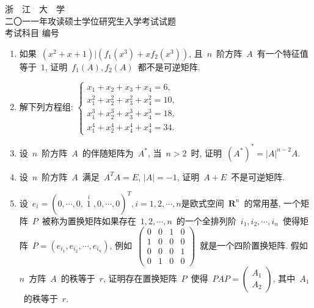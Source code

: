 \documentclass[UTF8,a4paper,11pt]{article}
\begin{document}
\newpage
\setcounter{page}{1}

\begin{center}
	{\Huge 浙~~江~~大~~学}\\
	\setlength{\parskip}{5pt}
	{\Large 二〇一一年攻读硕士学位研究生入学考试试题}\\
	\setlength{\parskip}{10 pt}
	{\Large 考试科目\underline{} 编号\underline{}}
\end{center}

\begin{enumerate}
	\item 如果~$(x^2+x+1)|(f_1(x^3)+xf_2(x^3))$, 且~$n$~阶方阵~$A$~有一个特征值等于~$1$, 证明~$f_1(A),f_2(A)$~都不是可逆矩阵.
	      \vspace{2em}
	\item 解下列方程组: $\begin{cases} x_1+x_2+x_3+x_4=6,\\x_1^2+x_2^2+x_3^2+x_4^2=10,\\ x_1^3+x_2^3+x_3^3+x_4^3=18,\\ x_1^4+x_2^4+x_4^4+x_4^4=34.\end{cases}$
	      \vspace{2em}
	\item 设~$n$~阶方阵~$A$~的伴随矩阵为~$A^{*}$, 当~$n>2$~时, 证明~$(A^{*})^{*}=|A|^{n-2}A$.
	      \vspace{2em}
	\item 设~$n$~阶方阵~$A$~满足~$A^{T}A=E$, $|A|=-1$, 证明~$A+E$~不是可逆矩阵.
	      \vspace{2em}
	\item 设~$e_i=(0,\cdots,0,\mathop{1}\limits^{i},0,\cdots,0)^{T}, i=1,2,\cdots,n$是欧式空间~$\mathbf{R}^n$~的常用基, 一个矩阵~$P$~被称为置换矩阵如果存在~$1,2,\cdots,n$~的一个全排列阶~$i_1,i_2,\cdots,i_n$~使得矩阵~$P=(e_{i_1},e_{i_2}, \cdots, e_{i_n})$, 例如~$\begin{pmatrix}0 & 0 & 1 & 0\\ 1 & 0 & 0 & 0\\ 0 & 0 & 0 & 1\\ 0 & 1 & 0 & 0 \end{pmatrix}$~就是一个四阶置换矩阵. 假如~$n$~方阵~$A$~的秩等于~$r$, 证明存在置换矩阵~$P$~使得~$PAP=\begin{pmatrix}A_1\\A_2\end{pmatrix}$, 其中~$A_1$~的秩等于~$r$.

\end{enumerate}
\end{document}
